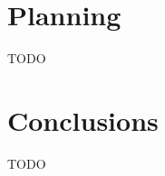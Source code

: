 \documentclass[runningheads]{llncs}
\begin{document}
\section{Planning}
TODO

\section{Conclusions}
TODO

%
%

%
%
%
% 
% 
%
\begin{thebibliography}{8}
\end{thebibliography}
\end{document}
